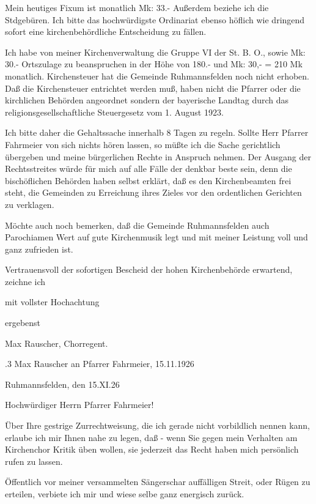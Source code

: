 \documentclass[12pt,a4paper]{book}
\begin{document}
Mein heutiges Fixum ist monatlich Mk: 33.- Außerdem beziehe ich die Stdgebüren.
Ich bitte das hochwürdigste Ordinariat ebenso höflich wie dringend sofort eine
kirchenbehördliche Entscheidung zu fällen.

Ich habe von meiner Kirchenverwaltung die Gruppe VI der St. B. O., sowie Mk:
30.- Ortszulage zu beanspruchen in der Höhe von 180.- und Mk: 30,- = 210 Mk
monatlich. Kirchensteuer hat die Gemeinde Ruhmannsfelden noch nicht erhoben. Daß
die Kirchensteuer entrichtet werden muß, haben nicht die Pfarrer oder die
kirchlichen Behörden angeordnet sondern der bayerische Landtag durch das
religionsgesellschaftliche Steuergesetz vom 1. August 1923.

Ich bitte daher die Gehaltssache innerhalb 8 Tagen zu regeln. Sollte Herr
Pfarrer Fahrmeier von sich nichts hören lassen, so müßte ich die Sache
gerichtlich übergeben und meine bürgerlichen Rechte in Anspruch nehmen. Der
Ausgang der Rechtsstreites würde für mich auf alle Fälle der denkbar beste sein,
denn die bischöflichen Behörden haben selbst erklärt, daß es den Kirchenbeamten
frei steht, die Gemeinden zu Erreichung ihres Zieles vor den ordentlichen
Gerichten zu verklagen.

Möchte auch noch bemerken, daß die Gemeinde Ruhmannsfelden auch Parochiamen Wert
auf gute Kirchenmusik legt und mit meiner Leistung voll und ganz zufrieden ist.

Vertrauensvoll der sofortigen Bescheid der hohen Kirchenbehörde erwartend,
zeichne ich



mit vollster Hochachtung

ergebenst

Max Rauscher, Chorregent.

.3 Max Rauscher an Pfarrer Fahrmeier, 15.11.1926

Ruhmannsfelden, den 15.XI.26



Hochwürdiger Herrn Pfarrer Fahrmeier!



Über Ihre gestrige Zurrechtweisung, die ich gerade nicht vorbildlich nennen
kann, erlaube ich mir Ihnen nahe zu legen, daß - wenn Sie gegen mein Verhalten
am Kirchenchor Kritik üben wollen, sie jederzeit das Recht haben mich persönlich
rufen zu lassen.

Öffentlich vor meiner versammelten Sängerschar auffälligen Streit, oder Rügen zu
erteilen, verbiete ich mir und wiese selbe ganz energisch zurück.
\end{document}
